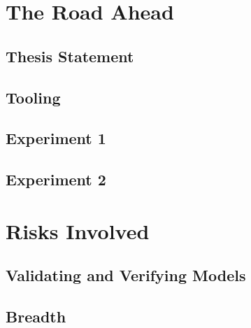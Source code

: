 \documentclass[draft,12pt]{article}
\begin{document}
\section{The Road Ahead}  %

\subsection{Thesis Statement}

\subsection{Tooling}

\subsection{Experiment 1}

\subsection{Experiment 2}



\section{Risks Involved}

\subsection{Validating and Verifying Models}

\subsection{Breadth}


\newpage  %

\end{document}
